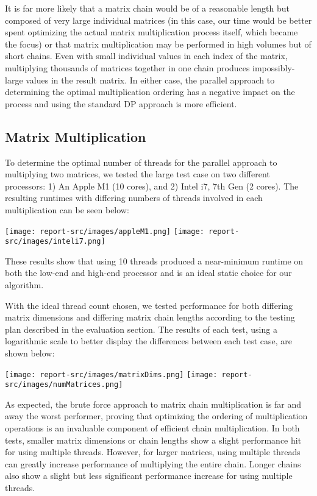 \documentclass[conference,leqno]{IEEEtran}
\begin{document}
It is far more likely that a matrix chain would be of a reasonable length but composed of very large individual matrices (in this case, our time would be better spent optimizing the actual matrix multiplication process itself, which became the focus) or that matrix multiplication may be performed in high volumes but of short chains. Even with small individual values in each index of the matrix, multiplying thousands of matrices together in one chain produces impossibly-large values in the result matrix. In either case, the parallel approach to determining the optimal multiplication ordering has a negative impact on the process and using the standard DP approach is more efficient.

\subsection{Matrix Multiplication}
To determine the optimal number of threads for the parallel approach to multiplying two matrices, we tested the large test case on two different processors: 1) An Apple M1 (10 cores), and 2) Intel i7, 7th Gen (2 cores). The resulting runtimes with differing numbers of threads involved in each multiplication can be seen below:

\texttt{[image: report-src/images/appleM1.png]}
\texttt{[image: report-src/images/inteli7.png]}

These results show that using 10 threads produced a near-minimum runtime on both the low-end and high-end processor and is an ideal static choice for our algorithm.

With the ideal thread count chosen, we tested performance for both differing matrix dimensions and differing matrix chain lengths according to the testing plan described in the evaluation section. The results of each test, using a logarithmic scale to better display the differences between each test case, are shown below:

\texttt{[image: report-src/images/matrixDims.png]}
\texttt{[image: report-src/images/numMatrices.png]}

As expected, the brute force approach to matrix chain multiplication is far and away the worst performer, proving that optimizing the ordering of multiplication operations is an invaluable component of efficient chain multiplication. In both tests, smaller matrix dimensions or chain lengths show a slight performance hit for using multiple threads. However, for larger matrices, using multiple threads can greatly increase performance of multiplying the entire chain. Longer chains also show a slight but less significant performance increase for using multiple threads.
\end{document}

